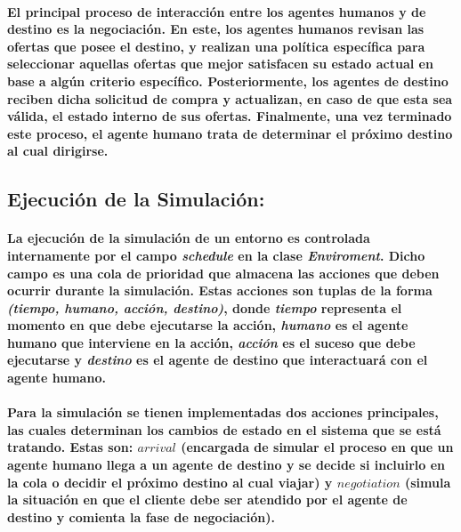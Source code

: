 \documentclass[12pt]{amsart}
\begin{document}
\paragraph{El principal proceso de interacción entre los agentes humanos y de destino es la negociación. En este, los agentes humanos revisan las ofertas que posee el destino, y realizan una política específica para seleccionar aquellas ofertas que mejor satisfacen su estado actual en base a algún criterio específico. Posteriormente, los agentes de destino reciben dicha solicitud de compra y actualizan, en caso de que esta sea válida, el estado interno de sus ofertas. Finalmente, una vez terminado este proceso, el agente humano trata de determinar el próximo destino al cual dirigirse.}

\subsection{Ejecución de la Simulación:}

\paragraph{La ejecución de la simulación de un entorno es controlada internamente por el campo \textit{schedule} en la clase \textit{Enviroment}. Dicho campo es una cola de prioridad que almacena las acciones que deben ocurrir durante la simulación. Estas acciones son tuplas de la forma \textit{(tiempo, humano, acción, destino)}, donde \textit{tiempo} representa el momento en que debe ejecutarse la acción, \textit{humano} es el agente humano que interviene en la acción, \textit{acción} es el suceso que debe ejecutarse y \textit{destino} es el agente de destino que interactuará con el agente humano.}

\paragraph{Para la simulación se tienen implementadas dos acciones principales, las cuales determinan los cambios de estado en el sistema que se está tratando. Estas son: $arrival$ (encargada de simular el proceso en que un agente humano llega a un agente de destino y se decide si incluirlo en la cola o decidir el próximo destino al cual viajar) y $negotiation$ (simula la situación en que el cliente debe ser atendido por el agente de destino y comienta la fase de negociación).}
\end{document}
